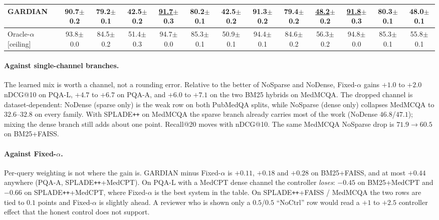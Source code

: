 \begin{table}[t]
{\begin{tabular}{l ccc ccc ccc ccc}
    \rowcolor{gray!18}
    GARDIAN
      & \textbf{90.7}{\scriptsize$\pm$0.2}
      & \textbf{79.2}{\scriptsize$\pm$0.1}
      & \textbf{42.5}{\scriptsize$\pm$0.2}
      & \underline{91.7}{\scriptsize$\pm$0.3}
      & \textbf{80.2}{\scriptsize$\pm$0.1}
      & \textbf{42.5}{\scriptsize$\pm$0.2}
      & \textbf{91.3}{\scriptsize$\pm$0.2}
      & \textbf{79.4}{\scriptsize$\pm$0.2}
      & \underline{48.2}{\scriptsize$\pm$0.2}
      & \underline{91.8}{\scriptsize$\pm$0.3}
      & \textbf{80.3}{\scriptsize$\pm$0.1}
      & \textbf{48.0}{\scriptsize$\pm$0.1} \\
    \midrule
    Oracle-$\alpha$ {\scriptsize[ceiling]}
      & 93.8{\scriptsize$\pm$0.0}
      & 84.5{\scriptsize$\pm$0.2}
      & 51.4{\scriptsize$\pm$0.3}
      & 94.7{\scriptsize$\pm$0.0}
      & 85.3{\scriptsize$\pm$0.1}
      & 50.9{\scriptsize$\pm$0.1}
      & 94.4{\scriptsize$\pm$0.1}
      & 84.6{\scriptsize$\pm$0.2}
      & 56.3{\scriptsize$\pm$0.2}
      & 94.8{\scriptsize$\pm$0.0}
      & 85.3{\scriptsize$\pm$0.1}
      & 55.8{\scriptsize$\pm$0.1} \\
    \bottomrule
  \end{tabular}%
  }
\end{table}

\paragraph{Against single-channel branches.}
The learned mix is worth a channel, not a rounding error. Relative to the
better of NoSparse and NoDense, Fixed-$\alpha$ gains $+1.0$ to $+2.0$ nDCG@10
on PQA-L, $+4.7$ to $+6.7$ on PQA-A, and $+6.0$ to $+7.1$ on the two BM25
hybrids on MedMCQA. The dropped channel is dataset-dependent: NoDense (sparse
only) is the weak row on both PubMedQA splits, while NoSparse (dense only)
collapses MedMCQA to $32.6$--$32.8$ on every family. With SPLADE\texttt{++} on
MedMCQA the sparse branch already carries most of the work (NoDense
$46.8$/$47.1$); mixing the dense branch still adds about one point. Recall@20
moves with nDCG@10. The same MedMCQA NoSparse drop is $71.9\to 60.5$ on
BM25+FAISS.

\paragraph{Against Fixed-$\alpha$.}
Per-query weighting is not where the gain is. GARDIAN minus Fixed-$\alpha$ is
$+0.11$, $+0.18$ and $+0.28$ on BM25+FAISS, and at most $+0.44$ anywhere
(PQA-A, SPLADE\texttt{++}+MedCPT). On PQA-L with a MedCPT dense channel the
controller \emph{loses}: $-0.45$ on BM25+MedCPT and $-0.66$ on
SPLADE\texttt{++}+MedCPT, where Fixed-$\alpha$ is the best system in the
table. On SPLADE\texttt{++}+FAISS / MedMCQA the two rows are tied to $0.1$
points and Fixed-$\alpha$ is slightly ahead. A reviewer who is shown only a
$0.5$/$0.5$ ``NoCtrl'' row would read a $+1$ to $+2.5$ controller effect that
the honest control does not support.

